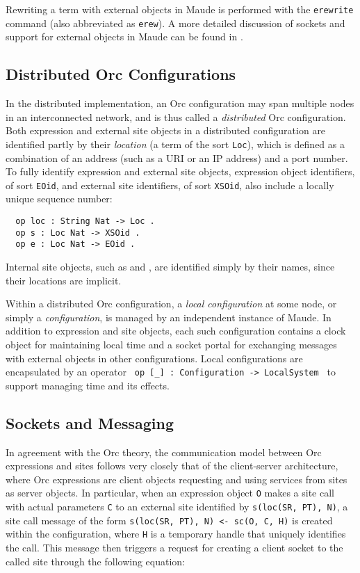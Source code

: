 \documentclass{eptcs}
\begin{document}
Rewriting a term with external objects in Maude is performed with the \texttt{erewrite} command (also abbreviated as \texttt{erew}). A more detailed discussion of sockets and support for external objects in Maude can be found in \cite{maude-book}.



\subsection{Distributed Orc Configurations}

In the distributed implementation, an Orc configuration may span multiple nodes in an interconnected network, and is thus called a \emph{distributed} Orc configuration. Both expression and external site objects in a distributed configuration are identified partly by their \emph{location} (a term of the sort \texttt{Loc}), which is defined as a combination of an address (such as a URI or an IP address) and a port number. To fully identify expression and external site objects, expression object identifiers, of sort \texttt{EOid}, and external site identifiers, of sort \texttt{XSOid}, also include a locally unique sequence number:

\begin{small}
\begin{verbatim}
  op loc : String Nat -> Loc .
  op s : Loc Nat -> XSOid .     
  op e : Loc Nat -> EOid .
\end{verbatim}
\end{small}

Internal site objects, such as  and , are identified simply by their names, since their locations are implicit.

Within a distributed Orc configuration, a \emph{local configuration} at some node, or simply a \emph{configuration}, is managed by an independent instance of Maude. In addition to expression and site objects, each such configuration contains a clock object for maintaining local time and a socket portal for exchanging messages with external objects in other configurations. Local configurations are encapsulated by an operator \texttt{ op [\_] :~Configuration -> LocalSystem } to support managing time and its effects. 


\subsection{Sockets and Messaging}\label{sec:sockets-messaging}

In agreement with the Orc theory, the communication model between Orc expressions and sites follows very closely that of the client-server architecture, where Orc expressions are client objects requesting and using services from sites as server objects.
In particular, when an expression object \texttt{O} makes a site call with actual parameters \texttt{C} to an external site identified by \texttt{s(loc(SR, PT), N)}, a site call message of the form  \texttt{s(loc(SR, PT), N) <- sc(O, C, H)} is created within the configuration, where \texttt{H} is a temporary handle that uniquely identifies the call. This message then triggers a request for creating a client socket to the called site through the following equation:
\end{document}

